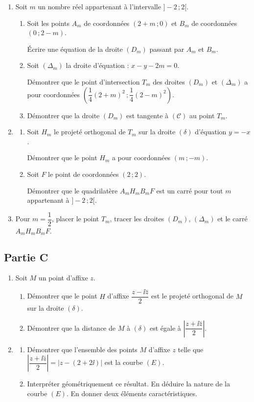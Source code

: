 \begin{enumerate}
	\item Soit $m$ un nombre réel appartenant à l'intervalle $]-2\,;2[$.
	\begin{enumerate}
		\item Soit les points $A_m$ de coordonnées $(2+m\,;0)$ et $B_m$ de coordonnées $(0\,;2-m)$.

		Écrire une équation de la droite $(D_m)$ passant par $A_m$ et $B_m$.
		\item Soit $(\Delta_m)$ la droite d'équation : $x-y-2m=0$.

		Démontrer que le point d'intersection $T_m$ des droites $(D_m)$ et $(\Delta_m)$ a pour coordonnées $\left(\dfrac14(2+m)^2\,;\dfrac14(2-m)^2\right)$.
		\item Démontrer que la droite $(D_m)$ est tangente à $(\mathscr{C})$ au point $T_m$.
	\end{enumerate}
	\item
	\begin{enumerate}
		\item Soit $H_m$ le projeté orthogonal de $T_m$ sur la droite $(\delta)$ d'équation $y=-x$.

		Démontrer que le point $H_m$ a pour coordonnées $(m\,;-m)$.
		\item Soit $F$ le point de coordonnées $(2\,;2)$.

		Démontrer que le quadrilatère $A_mH_mB_mF$ est un carré pour tout $m$ appartenant à $]-2\,;2[$.
	\end{enumerate}
	\item Pour $m=\dfrac12$, placer le point $T_m$, tracer les droites $(D_m)$, $(\Delta_m)$ et le carré $A_mH_mB_mF$.
\end{enumerate}

\subsection*{Partie C}

\begin{enumerate}
	\item Soit $M$ un point d'affixe $z$.
	\begin{enumerate}
		\item Démontrer que le point $H$ d'affixe $\dfrac{z-\ii\bar{z}}{2}$ est le projeté orthogonal de $M$ sur la droite $(\delta)$.
		\item Démontrer que la distance de $M$ à $(\delta)$ est égale à $\left|\dfrac{z+\ii\bar{z}}{2}\right|$.
	\end{enumerate}
	\item
	\begin{enumerate}
		\item Démontrer que l'ensemble des points $M$ d'affixe $z$ telle que $\left|\dfrac{z+\ii\bar{z}}{2}\right| = |z-(2+2\ii)|$ est la courbe $(E)$.
		\item Interpréter géométriquement ce résultat. En déduire la nature de la courbe $(E)$. En donner deux éléments caractéristiques.
	\end{enumerate}
\end{enumerate}


